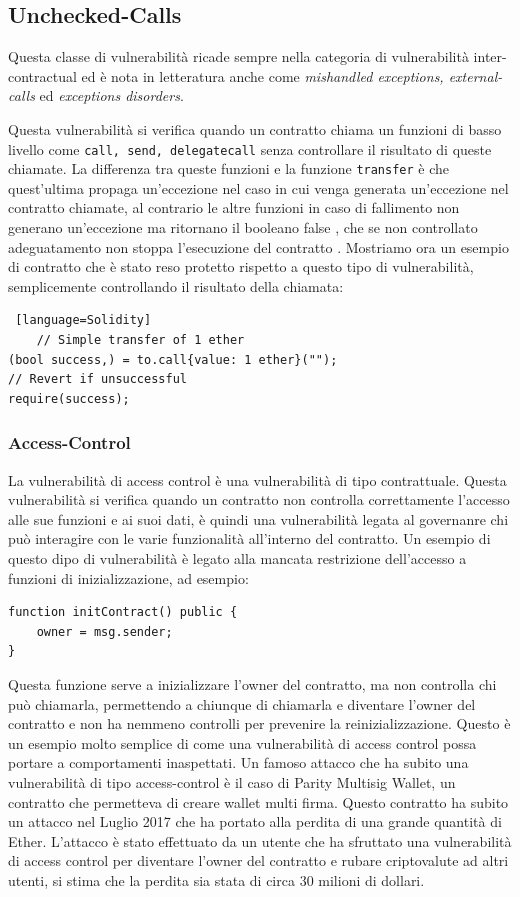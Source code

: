 \documentclass[../../Thesis.tex]{subfiles}
\begin{document}
\subsection{Unchecked-Calls}
Questa classe di vulnerabilità ricade sempre nella categoria di vulnerabilità inter-contractual ed è nota in letteratura anche come \emph{mishandled exceptions, external-calls} ed  \emph{exceptions disorders}. 

Questa vulnerabilità si verifica quando un contratto chiama un funzioni di basso livello come \texttt{call, send, delegatecall} senza controllare il risultato di queste chiamate. La differenza tra queste funzioni e la funzione \texttt{transfer} è che quest'ultima propaga un'eccezione nel caso in cui venga generata un'eccezione nel contratto chiamate, al contrario le altre funzioni in caso di fallimento non generano un'eccezione ma ritornano il booleano false \cite{SurveySC}, che se non controllato adeguatamento non stoppa l'esecuzione del contratto \cite{careSC}.  Mostriamo ora un esempio di contratto che è stato reso protetto rispetto a questo tipo di vulnerabilità, semplicemente controllando il risultato della chiamata:
\begin{lstlisting} [language=Solidity]
    // Simple transfer of 1 ether
(bool success,) = to.call{value: 1 ether}("");
// Revert if unsuccessful
require(success);
\end{lstlisting}


\subsubsection{Access-Control}
La vulnerabilità di access control è una vulnerabilità di tipo contrattuale. Questa vulnerabilità si verifica quando un contratto non controlla correttamente l'accesso alle sue funzioni e ai suoi dati, è quindi una vulnerabilità legata al governanre chi può interagire con le varie funzionalità all'interno del contratto. Un esempio di questo dipo di vulnerabilità è legato alla mancata restrizione dell'accesso a funzioni di inizializzazione, ad esempio:
\begin{lstlisting}[language=Solidity]
function initContract() public {
    owner = msg.sender;
}
\end{lstlisting} 
Questa funzione serve a inizializzare l'owner del contratto, ma non controlla chi può chiamarla, permettendo a chiunque di chiamarla e diventare l'owner del contratto e non ha nemmeno controlli per prevenire la reinizializzazione. Questo è un esempio molto semplice di come una vulnerabilità di access control possa portare a comportamenti inaspettati. 
Un famoso attacco che ha subito una vulnerabilità di tipo access-control è il caso di Parity Multisig Wallet, un contratto che permetteva di creare wallet multi firma. Questo contratto ha subito un attacco nel Luglio 2017 che ha portato alla perdita di una grande quantità di Ether. L'attacco è stato effettuato da un utente che ha sfruttato una vulnerabilità di access control per diventare l'owner del contratto e rubare criptovalute ad altri utenti, si stima che la perdita sia stata di circa 30 milioni di dollari.
\end{document}
